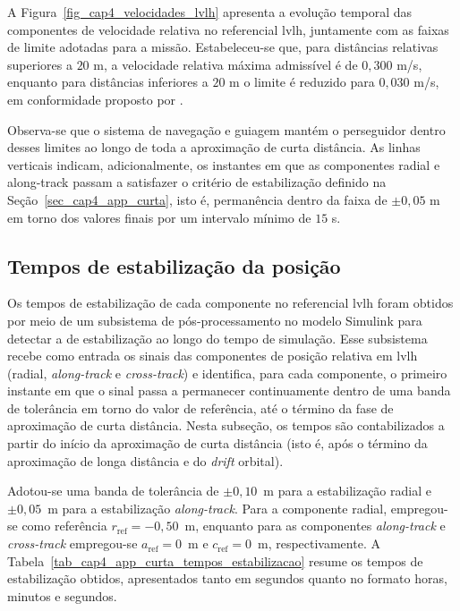 A Figura~\ref{fig_cap4_velocidades_lvlh} apresenta a evolução temporal das componentes de velocidade relativa no referencial \gls{lvlh}{,} juntamente com as faixas de limite adotadas para a missão. Estabeleceu-se que{,} para distâncias relativas superiores a $20$ m{,} a velocidade relativa máxima admissível é de $0{,}300$ m/s{,} enquanto para distâncias inferiores a $20$ m o limite é reduzido para $0{,}030$ m/s{,} em conformidade proposto por \cite{vedant2025longrange,mathworks_space_rendezvous_docking}.

Observa-se que o sistema de navegação e guiagem mantém o perseguidor dentro desses limites ao longo de toda a aproximação de curta distância. As linhas verticais indicam{,} adicionalmente{,} os instantes em que as componentes radial e along-track passam a satisfazer o critério de estabilização definido na Seção~\ref{sec_cap4_app_curta}{,} isto é{,} permanência dentro da faixa de $\pm 0{,}05$ m em torno dos valores finais por um intervalo mínimo de $15$ s.

\subsection{Tempos de estabilização da posição}

Os tempos de estabilização de cada componente no referencial \gls{lvlh} foram obtidos por meio de um subsistema de pós-processamento no modelo Simulink para detectar a de estabilização ao longo do tempo de simulação.
Esse subsistema recebe como entrada os sinais das componentes de posição relativa em \gls{lvlh} (radial, \emph{along-track} e \emph{cross-track}) e identifica, para cada componente, o primeiro instante em que o sinal passa a permanecer continuamente dentro de uma banda de tolerância em torno do valor de referência, até o término da fase de aproximação de curta distância. Nesta subseção, os tempos são contabilizados a partir do início da aproximação de curta distância (isto é, após o término da aproximação de longa distância e do \emph{drift} orbital).

Adotou-se uma banda de tolerância de $\pm 0{,}10$~m para a estabilização radial e $\pm 0{,}05$~m para a estabilização \emph{along-track}.
Para a componente radial, empregou-se como referência $r_{\mathrm{ref}}=-0{,}50$~m, enquanto para as componentes \emph{along-track} e \emph{cross-track} empregou-se $a_{\mathrm{ref}}=0$~m e $c_{\mathrm{ref}}=0$~m, respectivamente.
A Tabela~\ref{tab_cap4_app_curta_tempos_estabilizacao} resume os tempos de estabilização obtidos, apresentados tanto em segundos quanto no formato horas, minutos e segundos.

